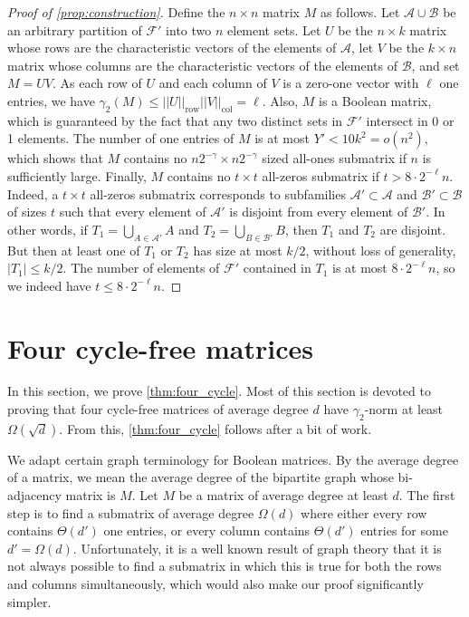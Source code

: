 \documentclass[11pt]{amsart}
\theoremstyle{plain}
\theoremstyle{definition}
\DeclareMathOperator{\row}{row}
\DeclareMathOperator{\col}{col}
\begin{document}
\begin{proof}[Proof of \cref{prop:construction}]
Define the $n\times n$ matrix $M$ as follows. Let $\mathcal{A}\cup\mathcal{B}$ be an arbitrary partition of $\mathcal{F}'$ into two $n$ element sets. Let $U$ be the $n\times k$ matrix whose rows are the characteristic vectors of the elements of $\mathcal{A}$, let $V$ be the $k\times n$ matrix whose columns are the characteristic vectors of the elements of $\mathcal{B}$, and set $M=UV$. As each row of $U$ and each column of $V$ is a zero-one vector with $\ell$ one entries, we have $\gamma_2(M)\leq ||U||_{\row}||V||_{\col}=\ell$. Also, $M$ is a Boolean matrix, which is guaranteed by the fact that any two distinct sets in $\mathcal{F}'$ intersect in 0 or 1 elements. The number of one entries of $M$ is at most $Y'<10k^2=o(n^2)$, which shows that $M$ contains no $n2^{-\gamma}\times n2^{-\gamma}$ sized all-ones submatrix if $n$ is sufficiently large. Finally, $M$ contains no $t\times t$ all-zeros submatrix if $t>8\cdot 2^{-\ell}n$. Indeed, a $t\times t$ all-zeros submatrix corresponds to subfamilies $\mathcal{A}'\subset \mathcal{A}$ and $\mathcal{B}'\subset \mathcal{B}$ of sizes $t$ such that every element of $\mathcal{A}'$ is disjoint from every element of $\mathcal{B}'$. In other words, if $T_1=\bigcup_{A\in\mathcal{A}'}A$  and $T_2=\bigcup_{B\in\mathcal{B}'} B$, then $T_1$ and $T_2$ are disjoint. But then at least one of $T_1$ or $T_2$ has size at most $k/2$, without loss of generality, $|T_1|\leq k/2$. The number of elements of $\mathcal{F}'$ contained in $T_1$ is at most $8\cdot 2^{-\ell}n$, so we indeed have $t\leq 8\cdot 2^{-\ell}n$.

\end{proof}

\section{Four cycle-free matrices}\label{sect:four_cycle}
In this section, we prove \cref{thm:four_cycle}. Most of this section is devoted to proving that four cycle-free matrices of average degree $d$ have $\gamma_2$-norm at least $\Omega(\sqrt{d})$. From this, \cref{thm:four_cycle} follows after a bit of work.

We adapt certain graph terminology for Boolean matrices. By the average degree of a matrix, we mean the average degree of the bipartite graph whose bi-adjacency matrix is $M$. Let $M$ be a matrix of average degree at least $d$. The first step is to find a submatrix of average degree $\Omega(d)$ where either every row contains $\Theta(d')$ one entries, or every column contains $\Theta(d')$ entries for some $d'=\Omega(d)$. Unfortunately, it is a well known result of graph theory \cite{JS} that it is not always possible to find a submatrix in which this is true for both the rows and columns simultaneously, which would also make our proof significantly simpler.
\end{document}

